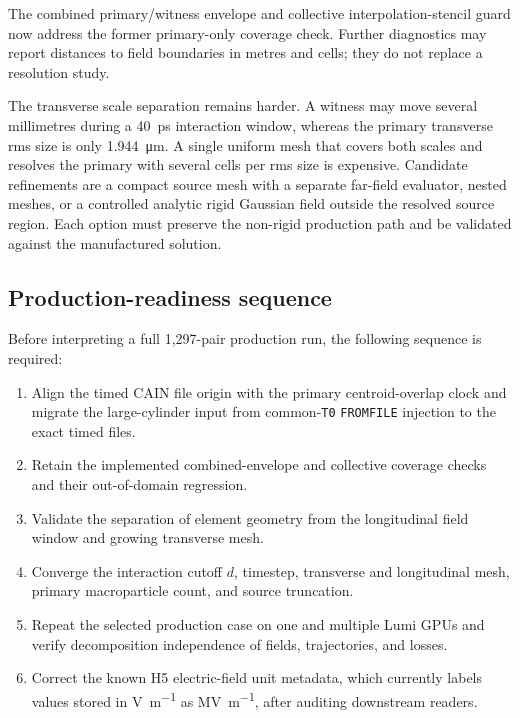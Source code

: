 \documentclass[11pt,a4paper]{article}
\newcommand{\code}[1]{\texttt{#1}}
\begin{document}
The combined primary/witness envelope and collective interpolation-stencil
guard now address the former primary-only coverage check.  Further diagnostics
may report distances to field boundaries in metres and cells; they do not
replace a resolution study.

The transverse scale separation remains harder.  A witness may move several
millimetres during a \SI{40}{\pico\second} interaction window, whereas the
primary transverse rms size is only \SI{1.944}{\micro\metre}.  A single uniform
mesh that covers both scales and resolves the primary with several cells per
rms size is expensive.  Candidate refinements are a compact source mesh with a
separate far-field evaluator, nested meshes, or a controlled analytic rigid
Gaussian field outside the resolved source region.  Each option must preserve
the non-rigid production path and be validated against the manufactured
solution.

\clearpage
\subsection{Production-readiness sequence}

Before interpreting a full 1,297-pair production run, the following sequence is
required:
\begin{enumerate}
  \item Align the timed CAIN file origin with the primary centroid-overlap
        clock and migrate the large-cylinder input from common-\code{T0}
        \code{FROMFILE} injection to the exact timed files.
  \item Retain the implemented combined-envelope and collective coverage checks
        and their out-of-domain regression.
  \item Validate the separation of element geometry from the longitudinal
        field window and growing transverse mesh.
  \item Converge the interaction cutoff $d$, timestep, transverse and
        longitudinal mesh, primary macroparticle count, and source truncation.
  \item Repeat the selected production case on one and multiple Lumi GPUs and
        verify decomposition independence of fields, trajectories, and losses.
  \item Correct the known H5 electric-field unit metadata, which currently
        labels values stored in \si{\volt\per\metre} as \si{\mega\volt\per\metre},
        after auditing downstream readers.
\end{enumerate}
\end{document}
